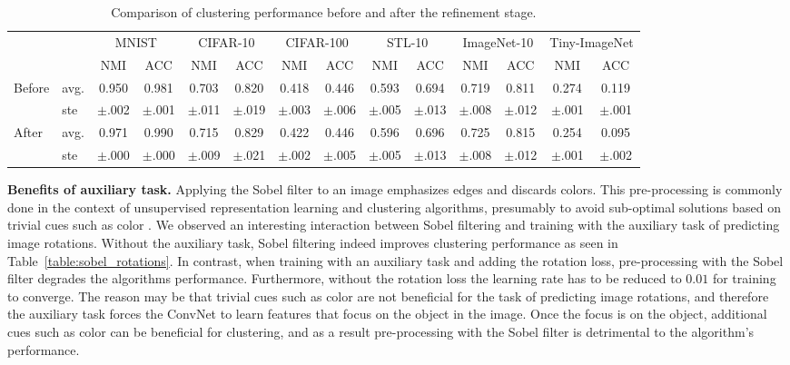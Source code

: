 \documentclass[a4paper,conference]{IEEEtran}
\begin{document}
\begin{table*}[t]
\begin{center}
\small
\caption{\protect\justify Comparison of clustering performance before and after the refinement stage.}
\label{table:refine}
\begin{tabular}{l l c c c c c c c c c c c c}
\toprule
 & & \multicolumn{2}{c}{MNIST} & \multicolumn{2}{c}{CIFAR-10} & \multicolumn{2}{c}{CIFAR-100} & \multicolumn{2}{c}{STL-10}  & \multicolumn{2}{c}{ImageNet-10} & \multicolumn{2}{c}{Tiny-ImageNet} \\
& & NMI & ACC & NMI & ACC & NMI & ACC & NMI & ACC & NMI & ACC & NMI & ACC \\
\midrule
\multirow{ 2}{*}{Before} & avg. & 0.950 & 0.981 & 0.703 & 0.820 & 0.418 & 0.446 & 0.593 & 0.694 & 0.719 & 0.811 & 0.274 & 0.119 \\
& ste & $\pm$.002 & $\pm$.001 & $\pm$.011 & $\pm$.019 & $\pm$.003 & $\pm$.006 & $\pm$.005 & $\pm$.013 & $\pm$.008 & $\pm$.012 & $\pm$.001 & $\pm$.001 \\
\midrule
\multirow{ 2}{*}{After} & avg. & 0.971 & 0.990 & 0.715 & 0.829 & 0.422 & 0.446 & 0.596 & 0.696 & 0.725 & 0.815 & 0.254 & 0.095 \\
& ste & $\pm$.000 & $\pm$.000 & $\pm$.009 & $\pm$.021 & $\pm$.002 & $\pm$.005 & $\pm$.005 & $\pm$.013 & $\pm$.008 & $\pm$.012 & $\pm$.001 & $\pm$.002 \\
\bottomrule
\end{tabular}
\end{center}
\end{table*}




\textbf{Benefits of auxiliary task.}
Applying the Sobel filter to an image emphasizes edges and discards colors. This pre-processing is commonly done in the context of unsupervised representation learning and clustering algorithms, presumably to avoid sub-optimal solutions based on trivial cues such as color \cite{BJ2017, iic}. We observed an interesting interaction between Sobel filtering and training with the auxiliary task of predicting image rotations. Without the auxiliary task, Sobel filtering indeed improves clustering performance as seen in Table~\ref{table:sobel_rotations}. In contrast, when training with an auxiliary task and adding the rotation loss, pre-processing with the Sobel filter degrades the algorithms performance. Furthermore, without the rotation loss the learning rate has to be reduced to $0.01$ for training to converge. The reason may be that trivial cues such as color are not beneficial for the task of predicting image rotations, and therefore the auxiliary task forces the ConvNet to learn features that focus on the object in the image. Once the focus is on the object, additional cues such as color can be beneficial for clustering, and as a result pre-processing with the Sobel filter is detrimental to the algorithm's performance.
\end{document}
